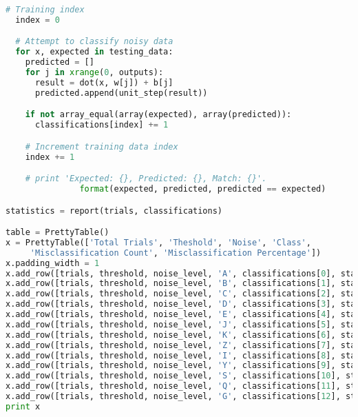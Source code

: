 \documentclass{article}
\begin{document}
\begin{lstlisting}[language=Python]
  # Training index
  index = 0

  # Attempt to classify noisy data
  for x, expected in testing_data:
    predicted = []
    for j in xrange(0, outputs):
      result = dot(x, w[j]) + b[j]
      predicted.append(unit_step(result))

    if not array_equal(array(expected), array(predicted)):
      classifications[index] += 1

    # Increment training data index
    index += 1

    # print 'Expected: {}, Predicted: {}, Match: {}'.
               format(expected, predicted, predicted == expected)

statistics = report(trials, classifications)

table = PrettyTable()
x = PrettyTable(['Total Trials', 'Theshold', 'Noise', 'Class', 
     'Misclassification Count', 'Misclassification Percentage'])
x.padding_width = 1
x.add_row([trials, threshold, noise_level, 'A', classifications[0], statistics[0]])
x.add_row([trials, threshold, noise_level, 'B', classifications[1], statistics[1]])
x.add_row([trials, threshold, noise_level, 'C', classifications[2], statistics[2]])
x.add_row([trials, threshold, noise_level, 'D', classifications[3], statistics[3]])
x.add_row([trials, threshold, noise_level, 'E', classifications[4], statistics[4]])
x.add_row([trials, threshold, noise_level, 'J', classifications[5], statistics[5]])
x.add_row([trials, threshold, noise_level, 'K', classifications[6], statistics[6]])
x.add_row([trials, threshold, noise_level, 'Z', classifications[7], statistics[7]])
x.add_row([trials, threshold, noise_level, 'I', classifications[8], statistics[8]])
x.add_row([trials, threshold, noise_level, 'Y', classifications[9], statistics[9]])
x.add_row([trials, threshold, noise_level, 'S', classifications[10], statistics[10]])
x.add_row([trials, threshold, noise_level, 'Q', classifications[11], statistics[11]])
x.add_row([trials, threshold, noise_level, 'G', classifications[12], statistics[12]])
print x
\end{lstlisting}
\end{document}

